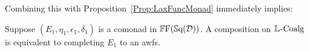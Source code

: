 Combining this with Proposition~\ref{Prop:LaxFuncMonad} immediately implies:

\begin{corollary}
	Suppose $(E_1,\eta_1,\epsilon_1,\delta_1)$ is a comonad in $\mathbb{F}\mathrm{F}(\mathbb{S}\mathrm{q}(\mathcal{D}))$. A composition on $\mathbb{L}_{}\text{-}\mathrm{Coalg}$ is equivalent to completing $E_1$ to an awfs.
\end{corollary}







